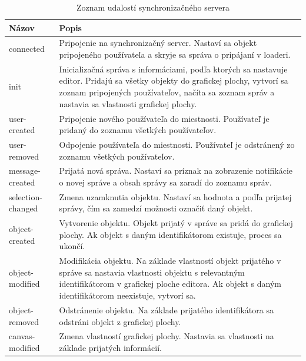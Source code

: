 \begin{table}
	\begin{tabular}{ | m{4cm} | m{8.5cm} | } \hline
		\textbf{Názov} & \textbf{Popis} \\ \hline \hline
		
		connected & Pripojenie na synchronizačný server. Nastaví sa objekt pripojeného používateľa a skryje sa správa o pripájaní v loaderi. \\\hline
		init & Inicializačná správa s informáciami, podľa ktorých sa nastavuje editor. Pridajú sa všetky objekty do grafickej plochy, vytvorí sa zoznam pripojených používateľov, načíta sa zoznam správ a nastavia sa vlastnosti grafickej plochy. \\\hline
		user-created & Pripojenie nového používateľa do miestnosti. Používateľ je pridaný do zoznamu všetkých používateľov. \\\hline
		user-removed & Odpojenie používateľa do miestnosti. Používateľ je odstránený zo zoznamu všetkých používateľov. \\\hline
		message-created & Prijatá nová správa. Nastaví sa príznak na zobrazenie notifikácie o novej správe a obsah správy sa zaradí do zoznamu správ. \\\hline
		selection-changed & Zmena uzamknutia objektu. Nastaví sa hodnota \code{selectable} a \code{selectedBy} podľa prijatej správy, čím sa zamedzí možnosti označiť daný objekt. \\\hline
		object-created & Vytvorenie objektu. Objekt prijatý v správe sa pridá do grafickej plochy. Ak objekt s daným identifikátorom existuje, proces sa ukončí. \\\hline
		object-modified & Modifikácia objektu. Na základe vlastností objekt prijatého v správe sa nastavia vlastnosti objektu s relevantným identifikátorom v grafickej ploche editora. Ak objekt s daným identifikátorom neexistuje, vytvorí sa. \\\hline
		object-removed & Odstránenie objektu. Na základe prijatého identifikátora sa odstráni objekt z grafickej plochy. \\\hline
 		canvas-modified & Zmena vlastností grafickej plochy. Nastavia sa vlastnosti na základe prijatých informácií. \\\hline
		   
		\hline
	\end{tabular}
	\caption{Zoznam udalostí synchronizačného servera}
\label{tab:server-events}
\end{table}


